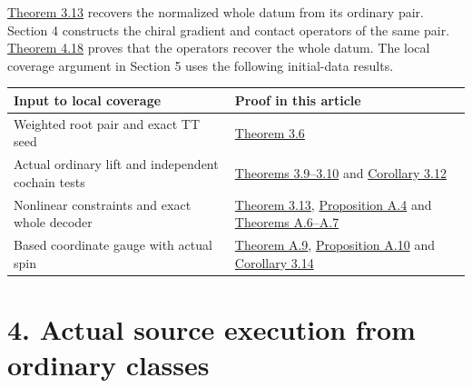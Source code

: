 \documentclass[
  english,
  11pt,
  reqno]{amsart}
\newcounter{none} %
\begin{document}
\hyperref[thm:online-ordinary-pair-data-bijection]{Theorem 3.13}
recovers the normalized whole datum from its ordinary pair. Section 4
constructs the chiral gradient and contact operators of the same pair.
\hyperref[thm:online-ordinary-negative-response-initial-source]{Theorem
4.18} proves that the operators recover the whole datum. The local
coverage argument in Section 5 uses the following initial-data results.

{\def\LTcaptype{none} %
\begin{longtable}[]{@{}
  >{\raggedright\arraybackslash}p{}
  >{\raggedright\arraybackslash}p{}@{}}
\toprule\noalign{}
\begin{minipage}[b]{\linewidth}\raggedright
Input to local coverage
\end{minipage} & \begin{minipage}[b]{\linewidth}\raggedright
Proof in this article
\end{minipage} \\
\midrule\noalign{}
\endhead
\bottomrule\noalign{}
\endlastfoot
Weighted root pair and exact TT seed &
\hyperref[thm:online-root-seed-isomorphism]{Theorem 3.6} \\
Actual ordinary lift and independent cochain tests &
\hyperref[thm:online-canonical-actual-pair-lift]{Theorems 3.9--3.10} and
\hyperref[cor:online-effective-ordinary-class-identification]{Corollary
3.12} \\
Nonlinear constraints and exact whole decoder &
\hyperref[thm:online-ordinary-pair-data-bijection]{Theorem 3.13},
\hyperref[prop:online-chart-exact-ambient-decoder]{Proposition A.4} and
\hyperref[thm:online-chart-base-constraint-bijection]{Theorems
A.6--A.7} \\
Based coordinate gauge with actual spin &
\hyperref[thm:online-gauge-based-normalization]{Theorem A.9},
\hyperref[prop:online-gauge-rotation-and-spin]{Proposition A.10} and
\hyperref[cor:online-ordinary-pair-ungauged-access]{Corollary 3.14} \\
\end{longtable}
}

\section{4. Actual source execution from ordinary
classes}\label{actual-source-execution-from-ordinary-classes}\label{sec:online-actual-source-execution}
\end{document}
